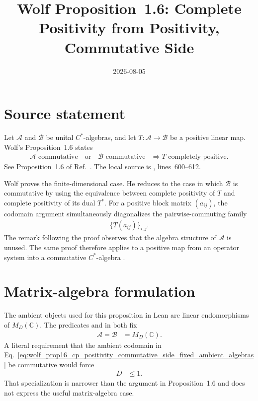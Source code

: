 \documentclass{article}
\title{Wolf Proposition~1.6: Complete Positivity from Positivity, Commutative Side}
\author{}
\date{2026-08-05}
\begin{document}
\maketitle
{}

\section{Source statement}

Let $\mathcal A$ and $\mathcal B$ be unital $C^*$-algebras, and let
$T:\mathcal A\to\mathcal B$ be a positive linear map. Wolf's
Proposition~1.6 states
\begin{align}
    \mathcal A\text{ commutative}
    \quad\text{or}\quad
    \mathcal B\text{ commutative}
        &\Longrightarrow T\text{ completely positive}.
    \label{eq:wolf_prop16_cp_positivity_commutative_side_source_statement}
\end{align}
See Proposition~1.6 of Ref.~\cite{Wolf2012Quantum}. The local source is
,
lines~600--612.

Wolf proves the finite-dimensional case. He reduces to the case in which
$\mathcal B$ is commutative by using the equivalence between complete
positivity of $T$ and complete positivity of its dual $T^*$. For a positive
block matrix $(a_{ij})$, the codomain argument simultaneously diagonalizes
the pairwise-commuting family
\begin{align}
    \{T(a_{ij})\}_{i,j}.
    \label{eq:wolf_prop16_cp_positivity_commutative_side_source_image_family}
\end{align}
The remark following the proof observes that the algebra structure of
$\mathcal A$ is unused. The same proof therefore applies to a positive map
from an operator system into a commutative $C^*$-algebra
\cite[Proposition~1.6]{Wolf2012Quantum}.

\section{Matrix-algebra formulation}

The ambient objects used for this proposition in Lean are linear
endomorphisms of $M_D(\mathbb C)$. The predicates  and
 in  both fix
\begin{align}
    \mathcal A
        =\mathcal B
        &=M_D(\mathbb C).
    \label{eq:wolf_prop16_cp_positivity_commutative_side_fixed_ambient_algebras}
\end{align}
A literal requirement that the ambient codomain in
Eq.~\ref{eq:wolf_prop16_cp_positivity_commutative_side_fixed_ambient_algebras}
be commutative would force
\begin{align}
    D&\leq1.
    \label{eq:wolf_prop16_cp_positivity_commutative_side_commutative_matrix_dimension}
\end{align}
That specialization is narrower than the argument in Proposition~1.6 and does
not express the useful matrix-algebra case.
\end{document}
